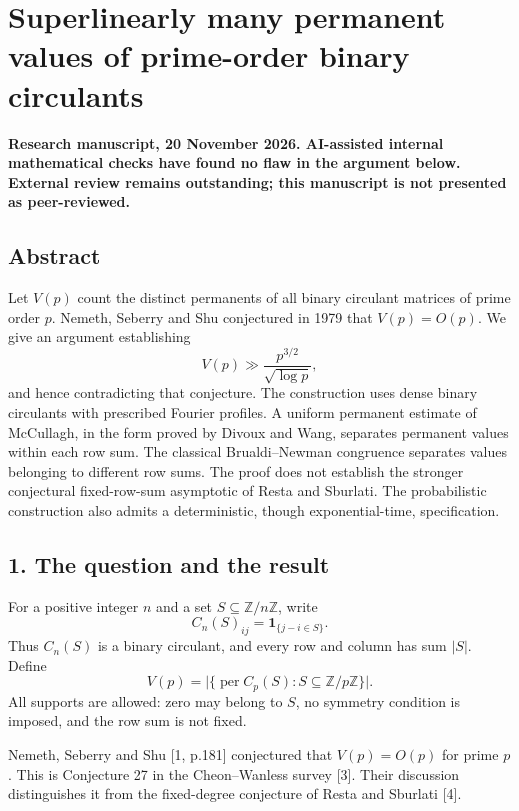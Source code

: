 \documentclass[
  11pt,
]{article}
\author{}
\date{}
\begin{document}
\section{Superlinearly many permanent values of prime-order binary
circulants}\label{superlinearly-many-permanent-values-of-prime-order-binary-circulants}

\textbf{Research manuscript, 20 November 2026. AI-assisted internal
mathematical checks have found no flaw in the argument below. External
review remains outstanding; this manuscript is not presented as
peer-reviewed.}

\subsection{Abstract}\label{abstract}

Let \(V(p)\) count the distinct permanents of all binary circulant
matrices of prime order \(p\). Nemeth, Seberry and Shu conjectured in
1979 that \(V(p)=O(p)\). We give an argument establishing \[
V(p)\gg \frac{p^{3/2}}{\sqrt{\log p}},
\] and hence contradicting that conjecture. The construction uses dense
binary circulants with prescribed Fourier profiles. A uniform permanent
estimate of McCullagh, in the form proved by Divoux and Wang, separates
permanent values within each row sum. The classical Brualdi--Newman
congruence separates values belonging to different row sums. The proof
does not establish the stronger conjectural fixed-row-sum asymptotic of
Resta and Sburlati. The probabilistic construction also admits a
deterministic, though exponential-time, specification.

\subsection{1. The question and the
result}\label{the-question-and-the-result}

For a positive integer \(n\) and a set
\(S\subseteq\mathbb Z/n\mathbb Z\), write \[
 C_n(S)_{ij}=\mathbf 1_{\{j-i\in S\}}.
\] Thus \(C_n(S)\) is a binary circulant, and every row and column has
sum \(|S|\). Define \[
 V(p)=\bigl|\{\operatorname{per}C_p(S):S\subseteq\mathbb Z/p\mathbb Z\}\bigr|.
\] All supports are allowed: zero may belong to \(S\), no symmetry
condition is imposed, and the row sum is not fixed.

Nemeth, Seberry and Shu {[}1, p.181{]} conjectured that \(V(p)=O(p)\)
for prime \(p\). This is Conjecture 27 in the Cheon--Wanless survey
{[}3{]}. Their discussion distinguishes it from the fixed-degree
conjecture of Resta and Sburlati {[}4{]}.
\end{document}
